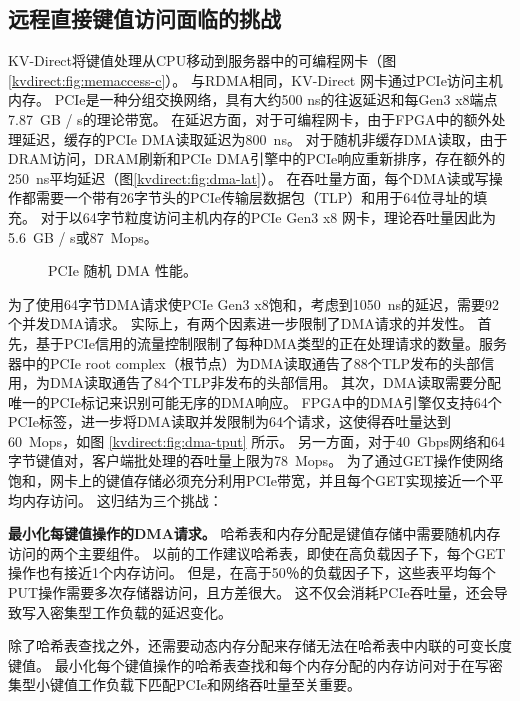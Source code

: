 \subsection{远程直接键值访问面临的挑战}
\label{kvdirect:sec:challenge}

KV-Direct将键值处理从CPU移动到服务器中的可编程网卡（图\ref {kvdirect:fig:memaccess-c}）。
与RDMA相同，KV-Direct 网卡通过PCIe访问主机内存。 PCIe是一种分组交换网络，具有大约500 ns的往返延迟和每Gen3 x8端点7.87~GB / s的理论带宽。
在延迟方面，对于可编程网卡，由于FPGA中的额外处理延迟，缓存的PCIe DMA读取延迟为800~ns。
对于随机非缓存DMA读取，由于DRAM访问，DRAM刷新和PCIe DMA引擎中的PCIe响应重新排序，存在额外的250~ns平均延迟（图\ref {kvdirect:fig:dma-lat}）。
在吞吐量方面，每个DMA读或写操作都需要一个带有26字节头的PCIe传输层数据包（TLP）和用于64位寻址的填充。
对于以64字节粒度访问主机内存的PCIe Gen3 x8 网卡，理论吞吐量因此为5.6~GB / s或87~Mops。

\begin{figure}[t]
	\centering
	\caption{PCIe 随机 DMA 性能。}
	\label{kvdirect:fig:dma-perf}
\end{figure}

为了使用64字节DMA请求使PCIe Gen3 x8饱和，考虑到1050~ns的延迟，需要92个并发DMA请求。
实际上，有两个因素进一步限制了DMA请求的并发性。
首先，基于PCIe信用的流量控制限制了每种DMA类型的正在处理请求的数量。服务器中的PCIe root complex（根节点）为DMA读取通告了88个TLP发布的头部信用，为DMA读取通告了84个TLP非发布的头部信用。
其次，DMA读取需要分配唯一的PCIe标记来识别可能无序的DMA响应。
FPGA中的DMA引擎仅支持64个PCIe标签，进一步将DMA读取并发限制为64个请求，这使得吞吐量达到60~Mops，如图 \ref {kvdirect:fig:dma-tput} 所示。
另一方面，对于40~Gbps网络和64字节键值对，客户端批处理的吞吐量上限为78~Mops。
为了通过GET操作使网络饱和，网卡上的键值存储必须充分利用PCIe带宽，并且每个GET实现接近一个平均内存访问。
这归结为三个挑战：

\textbf {最小化每键值操作的DMA请求。}
哈希表和内存分配是键值存储中需要随机内存访问的两个主要组件。
以前的工作建议哈希表\cite {dragojevic2014farm,breslow2016horton}，即使在高负载因子下，每个GET操作也有接近1个内存访问。
但是，在高于50％的负载因子下，这些表平均每个PUT操作需要多次存储器访问，且方差很大。
这不仅会消耗PCIe吞吐量，还会导致写入密集型工作负载的延迟变化。

除了哈希表查找之外，还需要动态内存分配来存储无法在哈希表中内联的可变长度键值。
最小化每个键值操作的哈希表查找和每个内存分配的内存访问对于在写密集型小键值工作负载下匹配PCIe和网络吞吐量至关重要。

